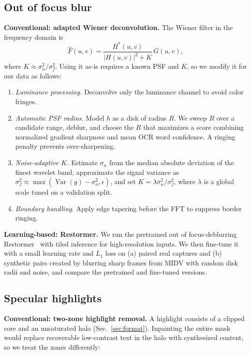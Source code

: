 \documentclass{article}
\begin{document}
\subsection{Out of focus blur}
\textbf{Conventional: adapted Wiener deconvolution.} The Wiener filter in the frequency domain is
\begin{equation}
\hat F(u,v) = \frac{H^{*}(u,v)}{|H(u,v)|^{2} + K}\, G(u,v),
\end{equation}
where $K \approx \sigma_n^2/\sigma_f^2$. Using it as-is requires a known PSF and $K$, so we modify it for our data as follows:
\begin{enumerate}
\item \emph{Luminance processing.} Deconvolve only the luminance channel to avoid color fringes.
\item \emph{Automatic PSF radius.} Model $h$ as a disk of radius $R$. We sweep $R$ over a candidate range, deblur, and choose the $R$ that maximizes a score combining normalized gradient sharpness and mean OCR word confidence. A ringing penalty prevents over-sharpening.

\item \emph{Noise-adaptive $K$.} Estimate $\sigma_n$ from the median absolute deviation of the finest wavelet band, approximate the signal variance as $\sigma_f^2 \approx \max(\operatorname{Var}(g)-\sigma_n^2,\epsilon)$, and set $K = \lambda \sigma_n^2/\sigma_f^2$, where $\lambda$ is a global scale tuned on a validation split.

\item \emph{Boundary handling.} Apply edge tapering before the FFT to suppress border ringing.
\end{enumerate}
\textbf{Learning-based: Restormer.} We run the pretrained out of focus-deblurring Restormer~\cite{zamir2022} with tiled inference for high-resolution inputs. We then fine-tune it with a small learning rate and $L_1$ loss on (a) paired real captures and (b) synthetic pairs created by blurring sharp frames from MIDV with random disk radii and noise, and compare the pretrained and fine-tuned versions.

\subsection{Specular highlights}
\textbf{Conventional: two-zone highlight removal.} A highlight consists of a clipped core and an unsaturated halo (Sec.~\ref{sec:format}). Inpainting the entire mask would replace recoverable low-contrast text in the halo with synthesized content, so we treat the zones differently:
\end{document}
